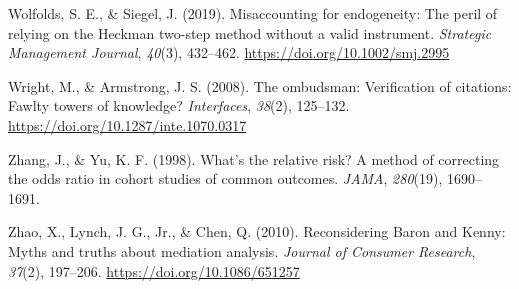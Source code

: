 \documentclass[
]{book}
\newlength{\cslhangindent}
\newenvironment{CSLReferences}[2] %
 {\begin{list}{}{%
  \setlength{\itemindent}{0pt}
  \setlength{\leftmargin}{0pt}
  \setlength{\parsep}{0pt}
  \ifodd #1
   \setlength{\leftmargin}{\cslhangindent}
   \setlength{\itemindent}{-1\cslhangindent}
  \fi
  \setlength{\itemsep}{#2\baselineskip}}}
 {\end{list}}
\begin{document}
\begin{CSLReferences}{1}{0}
Wolfolds, S. E., \& Siegel, J. (2019). Misaccounting for endogeneity: The peril of relying on the {Heckman} two-step method without a valid instrument. \emph{Strategic Management Journal}, \emph{40}(3), 432--462. \url{https://doi.org/10.1002/smj.2995}

Wright, M., \& Armstrong, J. S. (2008). The ombudsman: Verification of citations: Fawlty towers of knowledge? \emph{Interfaces}, \emph{38}(2), 125--132. \url{https://doi.org/10.1287/inte.1070.0317}

Zhang, J., \& Yu, K. F. (1998). What's the relative risk? {A} method of correcting the odds ratio in cohort studies of common outcomes. \emph{JAMA}, \emph{280}(19), 1690--1691.

Zhao, X., Lynch, J. G., Jr., \& Chen, Q. (2010). Reconsidering {Baron} and {Kenny}: Myths and truths about mediation analysis. \emph{Journal of Consumer Research}, \emph{37}(2), 197--206. \url{https://doi.org/10.1086/651257}

\end{CSLReferences}
\end{document}

